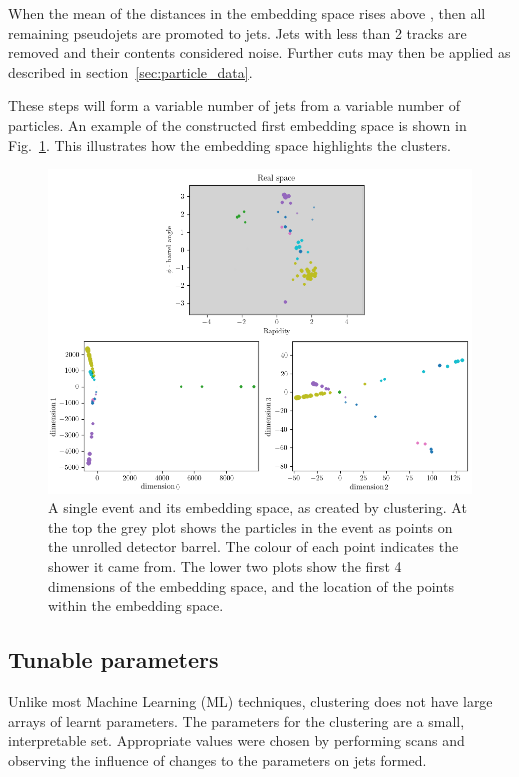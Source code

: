     When the mean of the distances in the embedding space rises above \stoppingdeltar{},
    then all remaining pseudojets are promoted to jets.
    Jets with less than 2 tracks are removed and their contents considered noise.
    Further cuts may then be applied as described in section~\ref{sec:particle_data}.

    These steps will form a variable number of jets from a variable number of particles.
    An example of the constructed first embedding space is shown in Fig.~\ref{fig:embedding_space_simple}.
    This illustrates how the embedding space highlights the clusters.

    \begin{figure}[!t]
        \includegraphics[width=1\textwidth]{graphics/embedding_space_simple2.png}
        \caption{A single event and its embedding space, as created by \spectral{} clustering.
            At the top the grey plot shows the particles in the event as points on the unrolled detector barrel.
            The colour of each point indicates the shower it came from.
            The lower two plots show the first 4 dimensions of the embedding space,
            and the location of the points within the embedding space.}\label{fig:embedding_space_simple}
    \end{figure}    


\subsection{Tunable parameters}\label{sec:spectralmethodparam}
Unlike most Machine Learning (ML) techniques, \spectral{} clustering does not have large arrays of learnt parameters.
The parameters for the clustering are a small, interpretable  set.
Appropriate values were chosen by performing scans and observing the influence of changes to the parameters on jets formed.

